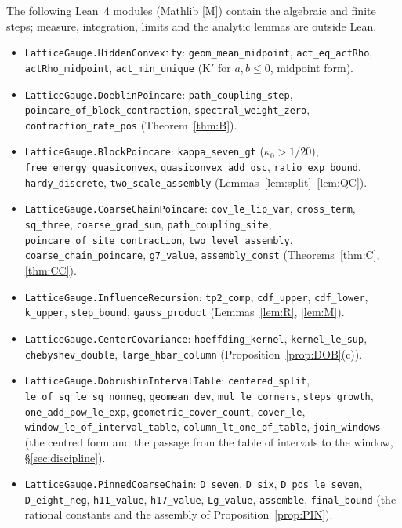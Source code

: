 \documentclass[11pt,a4paper]{article}
\theoremstyle{definition}
\theoremstyle{remark}
\newcommand{\code}[1]{\texttt{#1}}
\begin{document}
The following Lean~4 modules (Mathlib [M]) contain the algebraic and finite steps; measure, integration, limits and the analytic lemmas are outside Lean.
\begingroup\raggedright
\begin{itemize}[leftmargin=*]
\item \code{LatticeGauge.HiddenConvexity}: \code{geom\_mean\_midpoint}, \code{act\_eq\_actRho}, \code{actRho\_midpoint}, \code{act\_min\_unique} (K$'$ for $a,b\le0$, midpoint form).
\item \code{LatticeGauge.DoeblinPoincare}: \code{path\_coupling\_step}, \code{poincare\_of\_block\_contraction}, \code{spectral\_weight\_zero}, \code{contraction\_rate\_pos} (Theorem~\ref{thm:B}).
\item \code{LatticeGauge.BlockPoincare}: \code{kappa\_seven\_gt} ($\kappa_0>1/20$), \code{free\_energy\_quasiconvex}, \code{quasiconvex\_add\_osc}, \code{ratio\_exp\_bound}, \code{hardy\_discrete}, \code{two\_scale\_assembly} (Lemmas~\ref{lem:split}--\ref{lem:QC}).
\item \code{LatticeGauge.CoarseChainPoincare}: \code{cov\_le\_lip\_var}, \code{cross\_term}, \code{sq\_three}, \code{coarse\_grad\_sum}, \code{path\_coupling\_site}, \code{poincare\_of\_site\_contraction}, \code{two\_level\_assembly}, \code{coarse\_chain\_poincare}, \code{g7\_value}, \code{assembly\_const} (Theorems~\ref{thm:C}, \ref{thm:CC}).
\item \code{LatticeGauge.InfluenceRecursion}: \code{tp2\_comp}, \code{cdf\_upper}, \code{cdf\_lower}, \code{k\_upper}, \code{step\_bound}, \code{gauss\_product} (Lemmas~\ref{lem:R}, \ref{lem:M}).
\item \code{LatticeGauge.CenterCovariance}: \code{hoeffding\_kernel}, \code{kernel\_le\_sup}, \code{chebyshev\_double}, \code{large\_hbar\_column} (Proposition~\ref{prop:DOB}(c)).
\item \code{LatticeGauge.DobrushinIntervalTable}: \code{centered\_split}, \code{le\_of\_sq\_le\_sq\_nonneg}, \code{geomean\_dev}, \code{mul\_le\_corners}, \code{steps\_growth}, \code{one\_add\_pow\_le\_exp}, \code{geometric\_cover\_count}, \code{cover\_le}, \code{window\_le\_of\_interval\_table}, \code{column\_lt\_one\_of\_table}, \code{join\_windows} (the centred form and the passage from the table of intervals to the window, \S\ref{sec:discipline}).
\item \code{LatticeGauge.PinnedCoarseChain}: \code{D\_seven}, \code{D\_six}, \code{D\_pos\_le\_seven}, \code{D\_eight\_neg}, \code{h11\_value}, \code{h17\_value}, \code{Lg\_value}, \code{assemble}, \code{final\_bound} (the rational constants and the assembly of Proposition~\ref{prop:PIN}).
\end{itemize}
\end{document}
